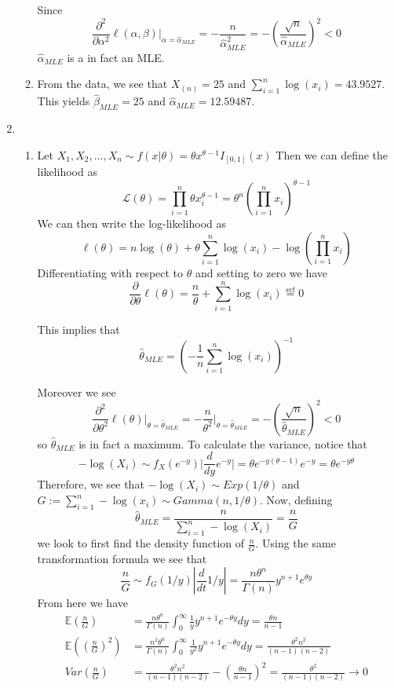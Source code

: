 \documentclass[12pt]{article}  %
\newcommand{\E}{{\mathbb{E}}}
\begin{document}
\begin{enumerate}
\begin{enumerate}
Since $$\frac{\partial^2}{\partial\alpha^2}\ell(\alpha, \beta)\Big\vert_{\alpha = \hat{\alpha}_{MLE}} = -\frac{n}{\hat{\alpha}_{MLE}^2} = -\left(\frac{\sqrt{n}}{\hat{\alpha}_{MLE}}\right)^2<0$$ $\hat{\alpha}_{MLE}$ is a in fact an MLE. 

\item From the data, we see that $X_{(n)} = 25$ and $\sum_{i=1}^n\log(x_i) = 43.9527$. This yields $\hat{\beta}_{MLE} = 25$ and $\hat{\alpha}_{MLE} = 12.59487$. 
\end{enumerate}

\item 
\begin{enumerate}
\item Let $X_1, X_2, \ldots, X_n\sim f(x|\theta) = \theta x^{\theta - 1}I_{[0,1]}(x)$ Then we can define the likelihood as $$\mathcal{L}(\theta) = \prod_{i=1}^n \theta x_i^{\theta-1} = \theta^n\left(\prod_{i=1}^n x_i\right)^{\theta - 1}$$ We can then write the log-likelihood as $$\ell(\theta) = n\log(\theta) + \theta\sum_{i=1}^n\log(x_i) - \log\left(\prod_{i=1}^n x_i\right)$$
Differentiating with respect to $\theta$ and setting to zero we have
$$\frac{\partial}{\partial \theta}\ell(\theta) = \frac{n}{\theta} + \sum_{i=1}^n\log(x_i) \overset{set}{=}0$$

This implies that $$\hat{\theta}_{MLE} = \left(-\frac{1}{n}\sum_{i=1}^{n}\log(x_i)\right)^{-1}$$

Moreover we see $$\frac{\partial^2}{\partial\theta^2}\ell(\theta)\Big\vert_{\theta = \hat{\theta}_{MLE}} = -\frac{n}{\theta^2}\Big\vert_{\theta = \hat{\theta}_{MLE}} = -\left(\frac{\sqrt{n}}{\hat{\theta}_{MLE}}\right)^2<0$$ so $\hat{\theta}_{MLE}$ is in fact a maximum. To calculate the variance, notice that $$-\log(X_i)\sim f_{X}(e^{-y})\big\vert\frac{d}{dy}e^{-y}\big\vert = \theta e^{-y(\theta-1)}e^{-y} = \theta e^{-y\theta}$$ Therefore, we see that $-\log(X_i)\sim Exp(1/\theta)$ and $G:= \sum_{i=1}^{n}-\log(x_i)\sim Gamma(n, 1/\theta)$. Now, defining $$\hat{\theta}_{MLE} = \frac{n}{\sum_{i=1}^{n}-\log(X_i)} = \frac{n}{G}$$ we look to first find the density function of $\frac{n}{G}$. Using the same transformation formula we see that $$\frac{n}{G}\sim f_{G}(1/y)|\frac{d}{dt}1/y| = \frac{n\theta^n}{\Gamma(n)}y^{n+1}e^{\theta y}$$ From here we have 
\begin{align*}
\E(\frac{n}{G}) &= \frac{n\theta^n}{\Gamma(n)}\int_{0}^{\infty} \frac{1}{y}y^{n+1}e^{-\theta y}dy = \frac{\theta n}{n-1}\\
\E((\frac{n}{G})^2) &= \frac{n^2\theta^n}{\Gamma(n)}\int_{0}^{\infty} \frac{1}{y^2}y^{n+1}e^{-\theta y}dy = \frac{\theta^2 n^2}{(n-1)(n-2)}\\
Var(\frac{n}{G}) &=  \frac{\theta^2 n^2}{(n-1)(n-2)} - \left(\frac{\theta n}{n-1}\right)^2 = \frac{\theta^2}{(n-1)(n-2)}\longrightarrow 0 
\end{align*}



\end{enumerate}
\end{enumerate}
\end{document}
